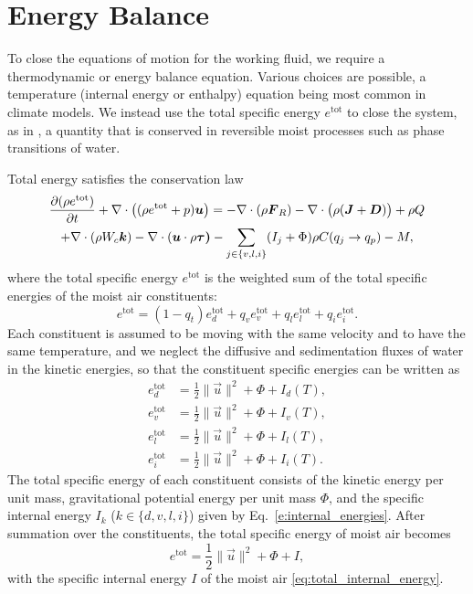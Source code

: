 \documentclass{report}
\begin{document}
\section{Energy Balance}\label{s:energy_balance}

To close the equations of motion for the working fluid, we require a thermodynamic or energy balance equation. Various choices are possible, a temperature (internal energy or enthalpy) equation being most common in climate models. We instead use the total specific energy $e^\mathrm{tot}$ to close the system, as in \citet{Romps08a}, a quantity that is conserved in reversible moist processes such as phase transitions of water. 

Total energy satisfies the conservation law \citep{Romps08a,Bott08a}
\begin{multline}
 \diff{(\rho e^\mathrm{tot})}{t} + \divergence \left( (\rho e^\mathrm{tot} + p)\vec{u} \right)
 = -\divergence (\rho \vec{F}_R) - \divergence \bigl(\rho (\vec{J} + \vec{D})\bigr) + \rho Q  \\
  +\divergence \left(\rho W_c \vec{k} \right)  - \divergence (\vec{u} \cdot \rho\vec{\tau)} %
   - \sum_{j\in\{v,l,i\}}(I_j + \Phi)  \rho C(q_j \rightarrow q_p) - M,
 \label{eq:energy_balance}
\end{multline}
where the total specific energy $e^{\mathrm{tot}}$ is the weighted sum of the total specific energies of the moist air constituents:
\begin{equation}\label{e:energy_sum}
    e^{\mathrm{tot}} = (1-q_t) e_d^{\mathrm{tot}} + q_v e_v^{\mathrm{tot}} + q_l e_l^{\mathrm{tot}} + q_i e_i^{\mathrm{tot}}.
\end{equation}
Each constituent is assumed to be moving with the same velocity and to have the same temperature, and we neglect the diffusive and sedimentation fluxes of water in the kinetic energies, so that the constituent specific energies can be written as
\begin{subequations}\label{e:constituent_energies}
\begin{align}
e_d^{\mathrm{tot}} & = \frac{1}{2} \| \vec{u} \|^2 + \Phi + I_d(T), \\
e_v^{\mathrm{tot}} & = \frac{1}{2} \| \vec{u} \|^2 + \Phi + I_v(T), \\
e_l^{\mathrm{tot}} & = \frac{1}{2} \| \vec{u} \|^2 + \Phi + I_l(T), \\
e_i^{\mathrm{tot}} & = \frac{1}{2} \| \vec{u} \|^2 + \Phi + I_i(T).
\end{align}
\end{subequations}
The total specific energy of each constituent consists of the kinetic energy per unit mass, gravitational potential energy per unit mass $\Phi$, and the specific internal energy $I_k$ ($k \in \{d, v, l, i\}$) given by Eq.~\eqref{e:internal_energies}. After summation over the constituents, the total specific energy of moist air becomes
\begin{equation}
     e^{\mathrm{tot}} = \frac{1}{2} \| \vec{u} \|^2 + \Phi + I,
     \label{eq:total_energy_def}
\end{equation}
with the specific internal energy $I$ of the moist air \eqref{eq:total_internal_energy}.
\end{document}
